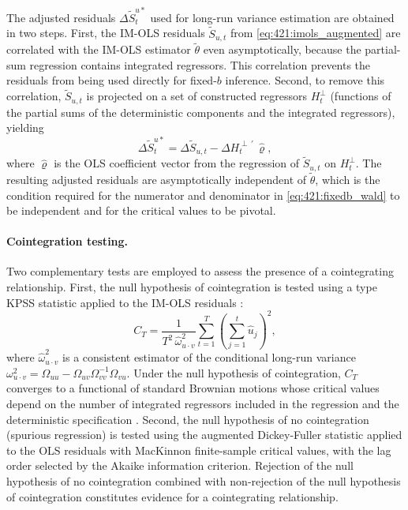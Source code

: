 The adjusted residuals $\Delta\tilde{S}^{u*}_t$ used for
long-run variance estimation are obtained in two steps. First,
the IM-OLS residuals $\tilde{S}_{u,t}$ from
\eqref{eq:421:imols_augmented} are correlated with the IM-OLS
estimator $\tilde{\theta}$ even asymptotically, because the
partial-sum regression contains integrated regressors. This
correlation prevents the residuals from being used directly
for fixed-$b$ inference. Second, to remove this correlation,
$\tilde{S}_{u,t}$ is projected on a set of constructed
regressors $H_t^{\perp}$ (functions of the partial sums of the
deterministic components and the integrated regressors), yielding
\begin{equation}
	\Delta\tilde{S}^{u*}_t = \Delta\tilde{S}_{u,t}
	- \Delta H_t^{\perp\,\prime}\,\hat{\varrho},
	\label{eq:421:adjusted_residuals}
\end{equation}
where $\hat{\varrho}$ is the OLS coefficient vector from the
regression of $\tilde{S}_{u,t}$ on $H_t^{\perp}$. The resulting
adjusted residuals are asymptotically independent of
$\tilde{\theta}$, which is the condition required for the
numerator and denominator in \eqref{eq:421:fixedb_wald} to be
independent and for the critical values to be pivotal.

\paragraph{Cointegration testing.}
Two complementary tests are employed to assess the presence of a
cointegrating relationship. First, the null hypothesis of
cointegration is tested using a \citet{Shin1994} type KPSS statistic
applied to the IM-OLS residuals \citep{WagnerHong2016,Wagner2023}:
\begin{equation}
	C_T = \frac{1}{T^2\, \hat{\omega}_{u \cdot v}^2}
	\sum_{t=1}^{T}
	\left(\sum_{j=1}^{t} \hat{u}_j
	\right)^2,
	\label{eq:421:shin_ct}
\end{equation}
where $\hat{\omega}_{u \cdot v}^2$ is a consistent estimator of
the conditional long-run variance $\omega_{u \cdot v}^2
= \Omega_{uu} - \Omega_{uv}\Omega_{vv}^{-1}\Omega_{vu}$. Under
the null hypothesis of cointegration, $C_T$ converges to a
functional of standard Brownian motions whose critical values depend
on the number of integrated regressors included in the regression
and the deterministic specification \citep{Wagner2013,Wagner2023}. Second,
the null hypothesis of no cointegration (spurious regression) is
tested using the augmented Dickey-Fuller statistic applied to the
OLS residuals with MacKinnon \citeyearpar{MacKinnon2010} finite-sample
critical values, with the lag order selected by the Akaike
information criterion. Rejection of the null hypothesis of no
cointegration combined with non-rejection of the null hypothesis of
cointegration constitutes evidence for a cointegrating relationship.

